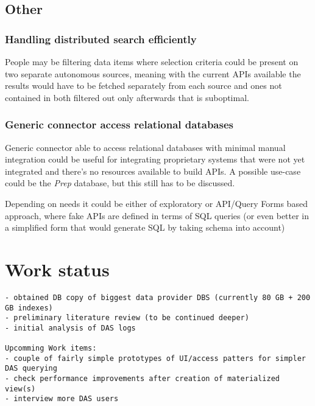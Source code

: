 \documentclass[a4paper,11pt,draft]{article}
\begin{document}
\subsection{Other}
\subsubsection*{Handling distributed search efficiently}
{\color{red} People may be filtering data items where selection criteria could be present on two separate autonomous sources, meaning with the current APIs available the results would have to be fetched separately from each source and ones not contained in both filtered out only afterwards that is suboptimal.}

\subsubsection*{Generic connector access relational databases}
{\color{red}Generic connector able to access relational databases with minimal manual integration could be useful for integrating proprietary systems that were not yet integrated and there's no resources available to build APIs. A possible use-case could be the \textit{Prep} database, but this still has to be discussed. 

Depending on needs it could be either of exploratory or API/Query Forms based approach, where fake APIs are defined in terms of SQL queries (or even better in a simplified form that would generate SQL by taking schema into account)}








\section{Work status}

\begin{verbatim}
- obtained DB copy of biggest data provider DBS (currently 80 GB + 200 GB indexes)
- preliminary literature review (to be continued deeper)
- initial analysis of DAS logs

Upcomming Work items:
- couple of fairly simple prototypes of UI/access patters for simpler DAS querying
- check performance improvements after creation of materialized view(s)
- interview more DAS users
\end{verbatim}



\thispagestyle{empty}
\begin{small}

\end{small}

\pagebreak

\end{document}
